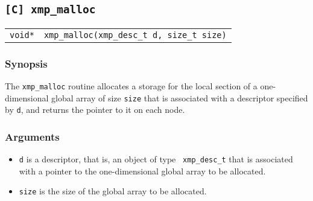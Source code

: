 \subsection{\tt [C] xmp\_malloc}

\begin{tabular}{ll}

{\tt void*} & {\tt xmp\_malloc(xmp\_desc\_t d, size\_t size)}

\end{tabular}

\subsubsection*{Synopsis}

The {\tt xmp\_malloc} routine allocates a storage for the local section
of a one-dimensional global array of size {\tt size} that is associated
with a descriptor specified by {\tt d}, and returns the pointer to it on
each node.

\subsubsection*{Arguments}

\begin{itemize}
 \item {\tt d} is a descriptor, that is, an object of type {\tt
       xmp\_desc\_t} that is associated with a pointer to the
       one-dimensional global array to be allocated.
 \item {\tt size} is the size of the global array to be allocated.
\end{itemize}


